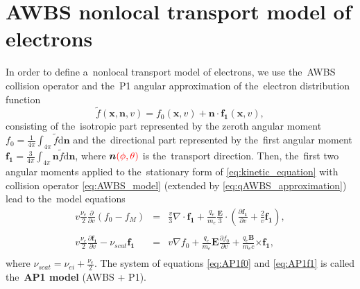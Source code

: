 \documentclass[
 aps,
 jmp,
 amsmath,amssymb,
 twocolumn,
]{revtex4-1}
\newcommand{\pdv}[2]{\frac{\partial{#1}}{\partial{#2}}}
\newcommand{\vect}[1]{\boldsymbol{#1}}
\newcommand{\dI}{\text{d}}
\newcommand{\nue}{\nu_{e}}
\newcommand{\nuei}{\nu_{ei}}
\newcommand{\nuscat}{\nu_{scat}}
\newcommand{\vmag}{v}
\newcommand{\vn}{\vect{n}}
\newcommand{\E}{\vect{E}}
\newcommand{\B}{\vect{B}}
\newcommand{\qe}{q_e}
\newcommand{\me}{m_e}
\newcommand{\fM}{f_M}
\newcommand{\fzero}{f_0}
\newcommand{\fone}{{\vect{f_1}}}
\newcommand{\ft}{f}
\newcommand{\corrMH}[1]{ {\color{red} #1} }
\begin{document}
\section{AWBS nonlocal transport model of electrons}
\label{sec:AWBSnonlocal}

In order to define a~nonlocal transport model of electrons, 
we use the~AWBS collision operator and the~P1 angular 
approximation of the~electron distribution function
\begin{equation}
  \tilde{\ft}(\vect{x}, \vn, \vmag) = 
  \fzero(\vect{x}, \vmag) + \vn\cdot\fone(\vect{x}, \vmag) , 
  \label{eq:P1approximation}
\end{equation}
consisting of the~isotropic part represented by the zeroth angular moment 
$\fzero = \frac{1}{4\pi}\int_{4\pi} \tilde{\ft} \dI\vn$ 
and the~directional part represented by the~first angular moment 
$\fone = \frac{3}{4\pi}\int_{4\pi} \vn
\tilde{\ft} \dI\vn$, where $\vn\corrMH{(\phi, \theta)}$ is the~transport direction.
Then, the~first two angular moments
\cite{Shkarofsky_Particle_Kinetics_book_1966_24} applied to the~stationary 
form of 
\eqref{eq:kinetic_equation} with collision operator \eqref{eq:AWBS_model} 
(extended by \eqref{eq:qAWBS_approximation}) lead to the~model equations
\begin{eqnarray}
  \vmag\frac{\nue}{2}\pdv{}{\vmag}\left(\fzero - \fM \right) &=&
  \frac{\vmag}{3}\nabla\cdot\fone + \frac{\qe}{\me}\frac{\E}{3}\cdot\left(
  \pdv{\fone}{\vmag} + \frac{2}{\vmag}\fone\right) , 
  \nonumber \\
  \label{eq:AP1f0}\\
  \vmag\frac{\nue}{2}\pdv{\fone}{\vmag}
  - \nuscat\fone &=& 
  \vmag\nabla\fzero + 
  \frac{\qe}{\me}\E\pdv{\fzero}{\vmag} 
  +\frac{\qe\B}{\me c}\vect{\times} \fone
  ,
  \nonumber \\
  \label{eq:AP1f1}
\end{eqnarray}
where $\nuscat = \nuei + \frac{\nue}{2}$. The system of equations 
\eqref{eq:AP1f0} and \eqref{eq:AP1f1} is called the~{\bf AP1 model} 
(AWBS + P1).  
\end{document}
